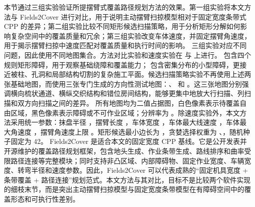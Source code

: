 \markdownRendererDocumentBegin
\markdownRendererSectionBegin
{}\markdownRendererParagraphSeparator
{}本节通过三组实验验证所提摆臂式覆盖路径规划方法的效果。第一组实验将本文方法与 Fields2Cover 进行对比，用于说明主动摆臂扫掠模型相对于固定宽度条带式 CPP 的差异；第二组实验比较不同矩形候选扫描策略，用于分析矩形分解如何影响复杂空间中的覆盖质量和冗余；第三组实验改变车体速度，并固定摆臂角速度，用于揭示摆臂扫掠中速度匹配对覆盖质量和执行时间的影响。\markdownRendererParagraphSeparator
{}三组实验对应不同问题，因此使用不同地图集合。方法对比实验和速度实验在  与  上进行。 包含四个规则矩形障碍，用于观察基础绕障和覆盖能力； 包含密集分布的小型障碍，更接近被柱、孔洞和局部结构切割的复杂施工平面。候选扫描策略实验不再使用上述两张基础地图，而使用三张专门生成的方向性测试地图：、 和 。这三张地图分别强调横向梳状通道、横纵交织结构和错位房间结构，能够更集中地放大行扫描、列扫描和双方向扫描之间的差异。\markdownRendererParagraphSeparator
{}所有地图均为二值占据图，白色像素表示待覆盖自由区域，黑色像素表示障碍或不可作业区域；分辨率为 。除速度实验外，本文方法采用统一参数：抹盘半径 ，摆臂长度 ，车体宽度 ，车体最大线速度 ，车体最大角速度 ，摆臂角速度上限 。矩形候选最小边长为 ，贪婪选择权重为 、，随机种子固定为 42。\markdownRendererParagraphSeparator
{}\markdownRendererSectionBegin
{}\markdownRendererParagraphSeparator
{}Fields2Cover 是适合本文的固定宽度 CPP 基线。它是公开发表并开源维护的覆盖路径规划框架，包含地头生成、作业条带生成、路线排序和曲率受限路径连接等完整模块；同时支持非凸区域、内部障碍物、固定作业宽度、车辆宽度、转弯半径和速度参数。因此，Fields2Cover 可以代表成熟的“固定机具宽度 + 条带覆盖 + 路径连接”规划范式。本文方法与其对比，目标不是比较两个软件实现的细枝末节，而是突出主动摆臂扫掠模型与固定宽度条带模型在有障碍空间中的覆盖形态和可执行性差别。\markdownRendererParagraphSeparator
